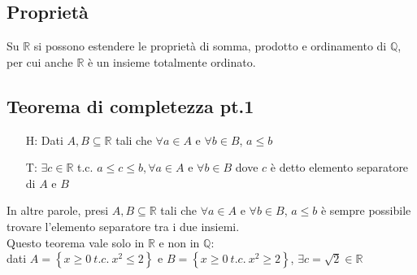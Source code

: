 \documentclass[a4paper]{article}
\begin{document}
\subsection{Proprietà}
Su \(\mathbb{R}\) si possono estendere le proprietà di somma, prodotto e ordinamento di \(\mathbb{Q}\), per cui anche \(\mathbb{R}\) è un insieme totalmente ordinato.


\subsection{Teorema di completezza pt.1}
\begin{itemize}
	\item[H: ] Dati \(A, B \subseteq \mathbb{R}\) tali che \(\forall a \in A\) e \(\forall b \in B\), \(a \leq b\)
	\item[T: ] \(\exists c \in \mathbb{R}\) t.c. \(a \leq c \leq b, \forall a \in A\) e \(\forall b \in B\) dove \(c\) è detto elemento separatore di \(A\) e \(B\)
\end{itemize}
In altre parole, presi \(A, B \subseteq \mathbb{R}\) tali che \(\forall a \in A\) e \(\forall b \in B\), \(a \leq b\) è sempre possibile trovare l'elemento separatore tra i due insiemi. \\
Questo teorema vale solo in \(\mathbb{R}\) e non in \(\mathbb{Q}\): \\
dati \(A=\left\{ x \geq 0 \  t.c. \  x^2 \leq 2 \right\}\) e \(B=\left\{ x \geq 0 \  t.c. \  x^2 \geq 2 \right\}\), \(\exists c = \sqrt{2} \in \mathbb{R}\)
\end{document}
